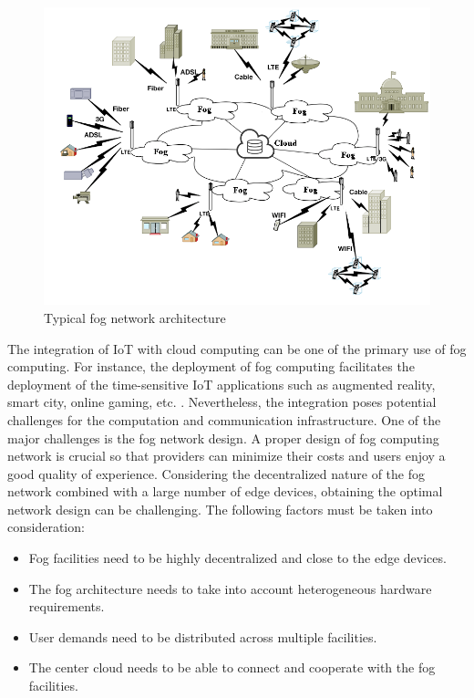 \documentclass[10pt,journal,compsoc]{IEEEtran}
\begin{document}
\begin{figure}[ht]
\centerline{\includegraphics[width=\columnwidth]{fog-g.png}}
\caption{Typical fog network architecture} 
\label{foggg}
\end{figure}
 
The integration of IoT with cloud computing can be one of the primary use of fog computing. For instance, the deployment of fog computing facilitates the deployment of the time-sensitive IoT applications such as augmented reality\cite{al2017energy}, smart city\cite{taleb2017mobile}, online gaming\cite{chen2016efficient}, etc.\cite{hong2013mobile,orsini2015computing,stojmenovic2014fog,zhu2013improving}
. Nevertheless, the integration poses potential challenges for the computation and communication infrastructure. One of the major challenges is the fog network design. A proper design of fog computing network is crucial so that providers can minimize their costs and users enjoy a good quality of experience. Considering the decentralized nature of the fog network combined with a large number of edge devices, obtaining the optimal network design can be challenging. The following factors must be taken into consideration:
\begin{itemize}
\item Fog facilities need to be highly decentralized and close to the edge devices.
\item The fog architecture needs to take into account heterogeneous hardware requirements.
\item User demands need to be distributed across multiple facilities.
\item The center cloud needs to be able to connect and cooperate with the fog facilities.
\end{itemize}
\end{document}
